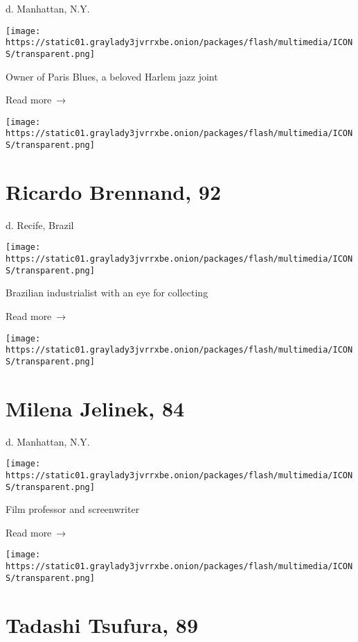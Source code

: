 d. Manhattan, N.Y.

\texttt{[image: https://static01.graylady3jvrrxbe.onion/packages/flash/multimedia/ICONS/transparent.png]}

Owner of Paris Blues, a beloved Harlem jazz joint

 Read more~→

\href{https://www.nytimes3xbfgragh.onion/2020/04/29/obituaries/ricardo-brennand-dead-coronavirus.html}{}

\texttt{[image: https://static01.graylady3jvrrxbe.onion/packages/flash/multimedia/ICONS/transparent.png]}

\hypertarget{ricardo-brennand-92}{%
\section{Ricardo Brennand, 92}\label{ricardo-brennand-92}}

d. Recife, Brazil

\texttt{[image: https://static01.graylady3jvrrxbe.onion/packages/flash/multimedia/ICONS/transparent.png]}

Brazilian industrialist with an eye for collecting

 Read more~→

\href{https://www.nytimes3xbfgragh.onion/2020/04/29/movies/milena-jelinek-dead-coronavirus.html}{}

\texttt{[image: https://static01.graylady3jvrrxbe.onion/packages/flash/multimedia/ICONS/transparent.png]}

\hypertarget{milena-jelinek-84}{%
\section{Milena Jelinek, 84}\label{milena-jelinek-84}}

d. Manhattan, N.Y.

\texttt{[image: https://static01.graylady3jvrrxbe.onion/packages/flash/multimedia/ICONS/transparent.png]}

Film professor and screenwriter

 Read more~→

\href{https://www.nytimes3xbfgragh.onion/2020/04/29/obituaries/tadashi-tsufura-dead-coronavirus.html}{}

\texttt{[image: https://static01.graylady3jvrrxbe.onion/packages/flash/multimedia/ICONS/transparent.png]}

\hypertarget{tadashi-tsufura-89}{%
\section{Tadashi Tsufura, 89}\label{tadashi-tsufura-89}}

